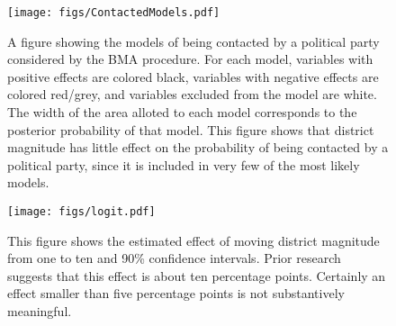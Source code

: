 \documentclass[12pt]{article}
\begin{document}
\newpage
\begin{figure}[h]
\centering
\texttt{[image: figs/ContactedModels.pdf]}
\caption{A figure showing the models of being contacted by a political party considered by the BMA procedure. For each model, variables with positive effects are colored black, variables with negative effects are colored red/grey, and variables excluded from the model are white. The width of the area alloted to each model corresponds to the posterior probability of that model. This figure shows that district magnitude has little effect on the probability of being contacted by a political party, since it is included in very few of the most likely models.}\label{fig:ContactedModels}
\end{figure}

%


\newpage
\begin{figure}[h]
\begin{center}
\texttt{[image: figs/logit.pdf]}
\caption{This figure shows the estimated effect of moving district magnitude from one to ten and 90\% confidence intervals. Prior research suggests that this effect is about ten percentage points. Certainly an effect smaller than five percentage points is not substantively meaningful.}\label{fig:logit}
\end{center}
\end{figure}
\end{document}
